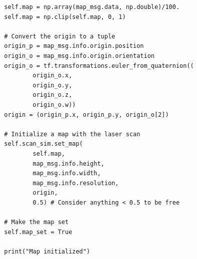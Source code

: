 \documentclass{article}
\begin{document}
{\begin{verbatim}
        self.map = np.array(map_msg.data, np.double)/100.
        self.map = np.clip(self.map, 0, 1)

        # Convert the origin to a tuple
        origin_p = map_msg.info.origin.position
        origin_o = map_msg.info.origin.orientation
        origin_o = tf.transformations.euler_from_quaternion((
                origin_o.x,
                origin_o.y,
                origin_o.z,
                origin_o.w))
        origin = (origin_p.x, origin_p.y, origin_o[2])

        # Initialize a map with the laser scan
        self.scan_sim.set_map(
                self.map,
                map_msg.info.height,
                map_msg.info.width,
                map_msg.info.resolution,
                origin,
                0.5) # Consider anything < 0.5 to be free

        # Make the map set
        self.map_set = True

        print("Map initialized")

\end{verbatim}
}
\end{document}
